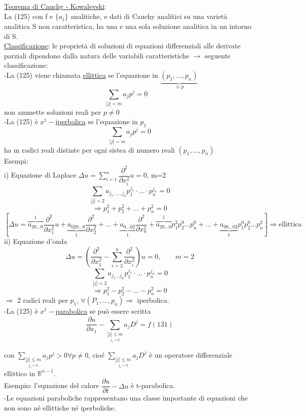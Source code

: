 \documentclass[a4paper,11pt]{report}
\newcommand{\R}{\mathbb{R}}
\begin{document}
\underline{Teorema di Cauchy - Kowalevski}:\\
La (125) con f e $\{a_j\}$ analitiche, e dati di Cauchy analitici su una varietà analitica S non caratteristica, ha una e una sola soluzione analitica in un intorno di S.\\
\underline{Classificazione}: le proprietà di soluzioni di equazioni differenziali alle derivate parziali dipendono dalla natura delle variabili caratteristiche $\rightarrow$ seguente classificazione:\\
-La (125) viene chiamata \underline{ellittica} se l'equazione in $\underset{\equiv p}{\underbrace{(p_1,\dots,p_n)}}$
$$
\sum_{|j|=m}a_jp^j=0 \quad 
$$
non ammette soluzioni reali per $p\neq 0$\\
-La (125) è $x^1-$\underline{iperbolica} se l'equazione in $p_1$
$$
\sum_{|j|=m}a_jp^j=0
$$
ha m radici reali distinte per ogni sistea di numero reali $(p_1,\dots,p_n)$\\
Esempi:\\
i) Equazione di Laplace $\Delta u=\sum_{i=1}^n\dfrac{\partial^2}{\partial x_i^2}u=0$, m=2
$$
\sum_{|j|=2} a_{j_1,\dots,j_n}p_1^{j_1}\cdot \dots \cdot p^{j_n}_n=0
$$
$$
\Rightarrow p_1^2 + p_2^2 + \dots + p_n^2 =0
$$
$$
\left[\Delta u = \overset{1}{\overbrace{a_{20\dots 0}}}\dfrac{\partial^2}{\partial x_1^2}u + \underset{1}{\underbrace{a_{020\dots 0}}}\dfrac{\partial^2}{\partial x_2^2} + \dots + \underset{1}{\underbrace{a_{0\dots 02}}}\dfrac{\partial^2}{\partial x_n^2}  + \overset{1}{\overbrace{a_{20\dots 0}}}p_1^2 p_2^0 \dots p_n^0 + \dots + \underset{1}{\underbrace{a_{00\dots 02}}}p_1^0p_2^0\dots p_n^2 \right]\Rightarrow \text{ellittica}
$$
ii) Equazione d'onda
$$
\Delta u =\left(\dfrac{\partial^2}{\partial x_1^2}-\sum_{i=2}^n\dfrac{\partial^2}{\partial x_i^2} \right)u=0, \qquad m=2
$$
$$
\sum_{|j|=2} a_{j_1 \dots j_n}p_1^{j_1}\cdot \dots \cdot p_n^{j_n}=0
$$
$$
\Rightarrow p_1^2 - p_2^2 - \dots - p_n^2=0
$$
$ \Rightarrow$ 2 radici reali per $p_1$, $\forall (P_1,\dots,p_n) \Rightarrow$ iperbolica.\\
-La (125) è $x^1-$\underline{parabolica} se può essere scritta
\begin{equation}
\dfrac{\partial u}{\partial x_1} - \sum_{\underset{j_1=0}{|j|\leq m}}a_jD^j=f (131)
\end{equation}

con $\sum_{\underset{j_1=0}{|j|\leq m}} a_jp^j >0 \forall p\neq 0$, cioé $\sum_{\underset{j_1=0}{|j|\leq m}} a_jD^j$ è un operatore differenziale ellittico in $\R^{n-1}$.\\
Esempio: l'equazione del calore $\dfrac{\partial u}{\partial t} - \Delta u$ è t-parabolica.\\
-Le equazioni paraboliche rappresentano una classe importante di equazioni che non sono né ellittiche né iperboliche.
\end{document}
